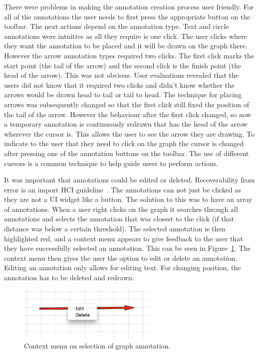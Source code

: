 There were problems in making the annotation creation process user friendly.  For all of the annotations the user needs to first press the appropriate button on the toolbar.  The next actions depend on the annotation type.  Text and circle annotations were intuitive as all they require is one click.  The user clicks where they want the annotation to be placed and it will be drawn on the graph there.  However the arrow annotation types required two clicks.  The first click marks the start point (the tail of the arrow) and the second click is the finish point (the head of the arrow).  This was not obvious. User evaluations revealed that the users did not know that it required two clicks and didn't know whether the arrows would be drawn head to tail or tail to head.  The technique for placing arrows was subsequently changed so that the first click still fixed the position of the tail of the arrow. However the behaviour after the first click changed, so now a temporary annotation is continuously redrawn that has the head of the arrow wherever the cursor is.  This allows the user to see the arrow they are drawing.  To indicate to the user that they need to click on the graph the cursor is changed after pressing one of the annotation buttons on the toolbar.  The use of different cursors is a common technique to help guide users to perform actions.

It was important that annotations could be edited or deleted.  Recoverability from error is an import \ac{HCI} guideline~\cite{shgold}\cite{normsev}\cite{neilten}.  The annotations can not just be clicked as they are not a \ac{UI} widget like a button.  The solution to this was to have an array of annotations.  When a user right clicks on the graph it searches through all annotations and selects the annotation that was closest to the click (if that distance was below a certain threshold).  The selected annotation is then highlighted red, and a context menu appears to give feedback to the user that they have successfully selected an annotation.  This can be seen in Figure~\ref{fig:annotation_selection}.  The context menu then gives the user the option to edit or delete an annotation.  Editing an annotation only allows for editing text.  For changing position, the annotation has to be deleted and redrawn.


\begin{figure}[h!]
    \centering
    \includegraphics[width=0.6\textwidth]{images/annotation_selection.png}
    \caption{Context menu on selection of graph annotation.}
    \label{fig:annotation_selection}
\end{figure}

